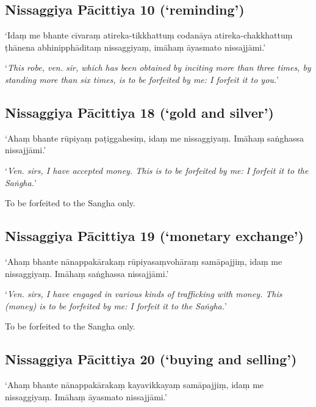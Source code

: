 
\subsection{Nissaggiya Pācittiya 10 (‘reminding’)}

‘Idaṃ me bhante cīvaraṃ atireka-tikkhattuṃ codanāya atireka-chakkhattuṃ ṭhānena
abhinipphāditaṃ nissaggiyaṃ, imāhaṃ āyasmato nissajjāmi.’

‘\emph{This robe, ven. sir, which has been obtained by inciting more
  than three times, by standing more than six times, is to be forfeited by me: I
  forfeit it to you.}’ 


\subsection{Nissaggiya Pācittiya 18 (‘gold and silver’)}

‘Ahaṃ bhante rūpiyaṃ paṭiggahesiṃ, idaṃ me nissaggiyaṃ. Imāhaṃ saṅghassa
nissajjāmi.’

‘\emph{Ven. sirs, I have accepted money. This is to be forfeited by me: I
  forfeit it to the Saṅgha.}’

To be forfeited to the Sangha only. 

\subsection{Nissaggiya Pācittiya 19 (‘monetary exchange’)}

‘Ahaṃ bhante nānappakārakaṃ rūpiyasaṃvohāraṃ samāpajjiṃ, idaṃ me nissaggiyaṃ.
Imāhaṃ saṅghassa nissajjāmi.’

‘\emph{Ven. sirs, I have engaged in various kinds of trafficking with money.
  This (money) is to be forfeited by me: I forfeit it to the Saṅgha.}’

To be forfeited to the Sangha only. 

\subsection{Nissaggiya Pācittiya 20 (‘buying and selling’)}

‘Ahaṃ bhante nānappakārakaṃ kayavikkayaṃ samāpajjiṃ, idaṃ me nissaggiyaṃ. Imāhaṃ
āyasmato nissajjāmi.’

